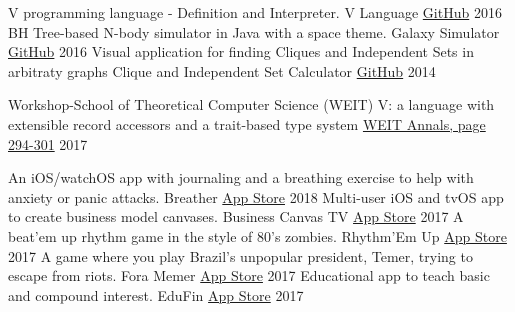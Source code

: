 

\begin{cventries}
  \cvcompactentry
    {V programming language - Definition and Interpreter.}
    {V Language}
    {\href{https://github.com/AvatarHurden/V}{GitHub}}
    {2016}
  \cvcompactentry
    {BH Tree-based N-body simulator in Java with a space theme.}
    {Galaxy Simulator}
    {\href{https://github.com/AvatarHurden/Simulador-Galaxias}{GitHub}}
    {2016}
  \cvcompactentry
    {Visual application for finding Cliques and Independent Sets in arbitraty graphs}
    {Clique and Independent Set Calculator}
    {\href{https://github.com/AvatarHurden/Clique-and-Ind.Set-Calculator}{GitHub}}
    {2014}
\end{cventries}

\newpage


\begin{cventries}
  \cventry
    {Workshop-School of Theoretical Computer Science (WEIT)}
    {V: a language with extensible record accessors and a trait-based type system}
    {\href{http://weit2017.inf.ufsm.br/wp-content/uploads/2017/10/Versao_final.pdf}{WEIT Annals, page 294-301}}
    {2017}
    {
    }
\end{cventries}


\begin{cventries}
  \cvcompactentry
    {An iOS/watchOS app with journaling and a breathing exercise to help with anxiety or panic attacks.}
    {Breather}
    {\href{https://itunes.apple.com/app/id1370659046?mt=8}{App Store}}
    {2018}
  \cvcompactentry
    {Multi-user iOS and tvOS app to create business model canvases.}
    {Business Canvas TV}
    {\href{https://itunes.apple.com/app/id1292335686?mt=8}{App Store}}
    {2017}
  \cvcompactentry
    {A beat'em up rhythm game in the style of 80's zombies.}
    {Rhythm'Em Up}
    {\href{https://itunes.apple.com/app/id1231577657?mt=8}{App Store}}
    {2017}
  \cvcompactentry
    {A game where you play Brazil's unpopular president, Temer, trying to escape from riots.}
    {Fora Memer}
    {\href{https://itunes.apple.com/br/app/fora-memer/id1253655537?l=en&mt=8}{App Store}}
    {2017}
  \cvcompactentry
    {Educational app to teach basic and compound interest.}
    {EduFin}
    {\href{https://itunes.apple.com/app/id1231577657?mt=8}{App Store}}
    {2017}
\end{cventries}

